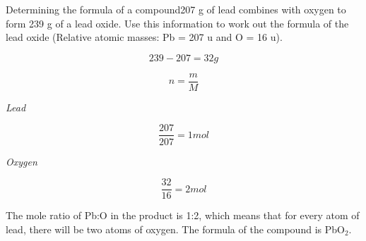 \begin{wex}{Determining the formula of a compound}{207 g of lead combines with oxygen to form 239 g of a lead oxide. Use this information to work out the formula of the lead oxide (Relative atomic masses: Pb = 207 u and O = 16 u).\\}

{

\begin{equation*}
239 - 207 = 32 g
\end{equation*}
}

{

\begin{equation*}
n = \frac{m}{M}
\end{equation*}

\textit{Lead}

\begin{equation*}
\frac{207}{207} = 1 mol
\end{equation*}

\textit{Oxygen}

\begin{equation*}
\frac{32}{16} = 2 mol
\end{equation*}
}

{

The mole ratio of Pb:O in the product is 1:2, which means that for every atom of lead, there will be two atoms of oxygen. The formula of the compound is PbO$_{2}$.
}
\end{wex}

